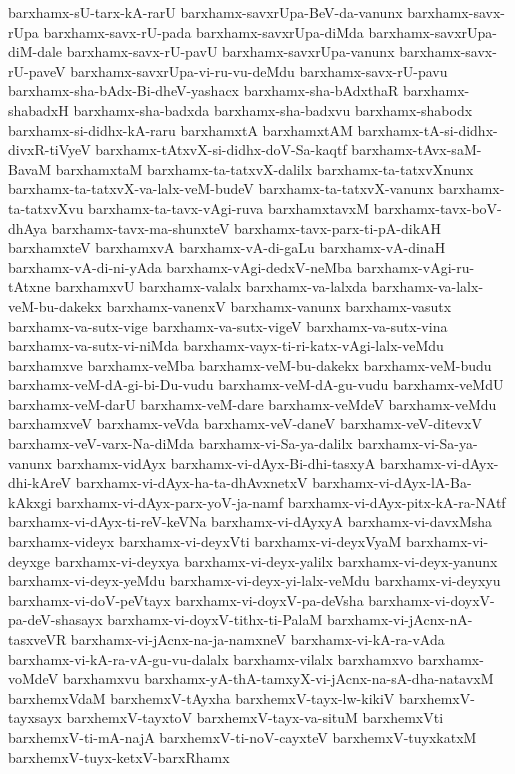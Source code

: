 {barxhamx-sU-tarx-kA-rarU
barxhamx-savxrUpa-BeV-da-vanunx
barxhamx-savx-rUpa
barxhamx-savx-rU-pada
barxhamx-savxrUpa-diMda
barxhamx-savxrUpa-diM-dale
barxhamx-savx-rU-pavU
barxhamx-savxrUpa-vanunx
barxhamx-savx-rU-paveV
barxhamx-savxrUpa-vi-ru-vu-deMdu
barxhamx-savx-rU-pavu
barxhamx-sha-bAdx-Bi-dheV-yashacx
barxhamx-sha-bAdxthaR
barxhamx-shabadxH
barxhamx-sha-badxda
barxhamx-sha-badxvu
barxhamx-shabodx
barxhamx-si-didhx-kA-raru
barxhamxtA
barxhamxtAM
barxhamx-tA-si-didhx-divxR-tiVyeV
barxhamx-tAtxvX-si-didhx-doV-Sa-kaqtf
barxhamx-tAvx-saM-BavaM
barxhamxtaM
barxhamx-ta-tatxvX-dalilx
barxhamx-ta-tatxvXnunx
barxhamx-ta-tatxvX-va-lalx-veM-budeV
barxhamx-ta-tatxvX-vanunx
barxhamx-ta-tatxvXvu
barxhamx-ta-tavx-vAgi-ruva
barxhamxtavxM
barxhamx-tavx-boV-dhAya
barxhamx-tavx-ma-shunxteV
barxhamx-tavx-parx-ti-pA-dikAH
barxhamxteV
barxhamxvA
barxhamx-vA-di-gaLu
barxhamx-vA-dinaH
barxhamx-vA-di-ni-yAda
barxhamx-vAgi-dedxV-neMba
barxhamx-vAgi-ru-tAtxne
barxhamxvU
barxhamx-valalx
barxhamx-va-lalxda
barxhamx-va-lalx-veM-bu-dakekx
barxhamx-vanenxV
barxhamx-vanunx
barxhamx-vasutx
barxhamx-va-sutx-vige
barxhamx-va-sutx-vigeV
barxhamx-va-sutx-vina
barxhamx-va-sutx-vi-niMda
barxhamx-vayx-ti-ri-katx-vAgi-lalx-veMdu
barxhamxve
barxhamx-veMba
barxhamx-veM-bu-dakekx
barxhamx-veM-budu
barxhamx-veM-dA-gi-bi-Du-vudu
barxhamx-veM-dA-gu-vudu
barxhamx-veMdU
barxhamx-veM-darU
barxhamx-veM-dare
barxhamx-veMdeV
barxhamx-veMdu
barxhamxveV
barxhamx-veVda
barxhamx-veV-daneV
barxhamx-veV-ditevxV
barxhamx-veV-varx-Na-diMda
barxhamx-vi-Sa-ya-dalilx
barxhamx-vi-Sa-ya-vanunx
barxhamx-vidAyx
barxhamx-vi-dAyx-Bi-dhi-tasxyA
barxhamx-vi-dAyx-dhi-kAreV
barxhamx-vi-dAyx-ha-ta-dhAvxnetxV
barxhamx-vi-dAyx-lA-Ba-kAkxgi
barxhamx-vi-dAyx-parx-yoV-ja-namf
barxhamx-vi-dAyx-pitx-kA-ra-NAtf
barxhamx-vi-dAyx-ti-reV-keVNa
barxhamx-vi-dAyxyA
barxhamx-vi-davxMsha
barxhamx-videyx
barxhamx-vi-deyxVti
barxhamx-vi-deyxVyaM
barxhamx-vi-deyxge
barxhamx-vi-deyxya
barxhamx-vi-deyx-yalilx
barxhamx-vi-deyx-yanunx
barxhamx-vi-deyx-yeMdu
barxhamx-vi-deyx-yi-lalx-veMdu
barxhamx-vi-deyxyu
barxhamx-vi-doV-peVtayx
barxhamx-vi-doyxV-pa-deVsha
barxhamx-vi-doyxV-pa-deV-shasayx
barxhamx-vi-doyxV-tithx-ti-PalaM
barxhamx-vi-jAcnx-nA-tasxveVR
barxhamx-vi-jAcnx-na-ja-namxneV
barxhamx-vi-kA-ra-vAda
barxhamx-vi-kA-ra-vA-gu-vu-dalalx
barxhamx-vilalx
barxhamxvo
barxhamx-voMdeV
barxhamxvu
barxhamx-yA-thA-tamxyX-vi-jAcnx-na-sA-dha-natavxM
barxhemxVdaM
barxhemxV-tAyxha
barxhemxV-tayx-lw-kikiV
barxhemxV-tayxsayx
barxhemxV-tayxtoV
barxhemxV-tayx-va-situM
barxhemxVti
barxhemxV-ti-mA-najA
barxhemxV-ti-noV-cayxteV
barxhemxV-tuyxkatxM
barxhemxV-tuyx-ketxV-barxRhamx
}
